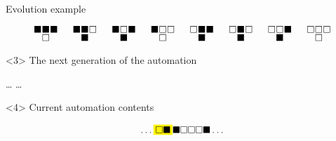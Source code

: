 \documentclass[presentation,aspectratio=169,smaller]{beamer}
\begin{document}
\begin{frame}[label={sec:org812e2ea},t]{Evolution example}
\begin{onlyenv}
\begin{equation*}
  \begingroup
  \setlength\arraycolsep{0.25pt}
  \renewcommand{\arraystretch}{0.5}
  \begin{matrix}
    \blacksquare & \blacksquare & \blacksquare \\
    & \square &
  \end{matrix}\mspace{28mu}
  \begin{matrix}
    \blacksquare & \blacksquare & \square \\
    & \blacksquare &
  \end{matrix}\mspace{28mu}
  \begin{matrix}
    \blacksquare & \square & \blacksquare \\
    & \blacksquare &
  \end{matrix}\mspace{28mu}
  \begin{matrix}
    \blacksquare & \square & \square \\
    & \square &
  \end{matrix}\mspace{28mu}
  \begin{matrix}
    \square & \blacksquare & \blacksquare \\
    & \blacksquare &
  \end{matrix}\mspace{28mu}
  \begin{matrix}
    \square & \blacksquare & \square \\
    & \blacksquare &
  \end{matrix}\mspace{28mu}
  \begin{matrix}
    \square & \square & \blacksquare \\
    & \blacksquare &
  \end{matrix}\mspace{28mu}
  \begin{matrix}
    \square & \square & \square \\
    & \square &
  \end{matrix}
  \endgroup
\end{equation*}
\end{onlyenv}

\begin{onlyenv}<3>
The next generation of the automation

\hfill \dots
\mspace{14mu} \mspace{14mu} \mspace{14mu} \mspace{14mu} \mspace{14mu} \mspace{14mu} \mspace{14mu}
\dots \hfill
\end{onlyenv}

\begin{onlyenv}<4>
Current automation contents

\begin{equation*}
  \hfill
  \dots
  \mathcolorbox{yellow}{%
    \square%
    \blacksquare%
  }%
  \blacksquare
  \square
  \square
  \square
  \blacksquare
  \dots
  \hfill
\end{equation*}


\end{onlyenv}
\end{frame}
\end{document}
